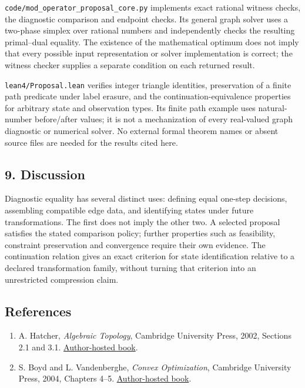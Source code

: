 \documentclass[
]{article}
\providecommand{\tightlist}{%
  \setlength{\itemsep}{0pt}\setlength{\parskip}{0pt}}
\begin{document}
\nolinkurl{code/mod_operator_proposal_core.py} implements exact rational
witness checks, the diagnostic comparison and endpoint checks. Its
general graph solver uses a two-phase simplex over rational numbers and
independently checks the resulting primal--dual equality. The existence
of the mathematical optimum does not imply that every possible input
representation or solver implementation is correct; the witness checker
supplies a separate condition on each returned result.

\nolinkurl{lean4/Proposal.lean} verifies integer triangle identities,
preservation of a finite path predicate under label erasure, and the
continuation-equivalence properties for arbitrary state and observation
types. Its finite path example uses natural-number before/after values;
it is not a mechanization of every real-valued graph diagnostic or
numerical solver. No external formal theorem names or absent source
files are needed for the results cited here.

\subsection{9. Discussion}\label{discussion}

Diagnostic equality has several distinct uses: defining equal one-step
decisions, assembling compatible edge data, and identifying states under
future transformations. The first does not imply the other two. A
selected proposal satisfies the stated comparison policy; further
properties such as feasibility, constraint preservation and convergence
require their own evidence. The continuation relation gives an exact
criterion for state identification relative to a declared transformation
family, without turning that criterion into an unrestricted compression
claim.

\subsection{References}\label{references}

\begin{enumerate}
\def\labelenumi{\arabic{enumi}.}
\tightlist
\item
  A. Hatcher, \emph{Algebraic Topology}, Cambridge University Press,
  2002, Sections 2.1 and 3.1.
  \href{https://pi.math.cornell.edu/~hatcher/AT/ATpage.html}{Author-hosted
  book}.
\item
  S. Boyd and L. Vandenberghe, \emph{Convex Optimization}, Cambridge
  University Press, 2004, Chapters 4--5.
  \href{https://web.stanford.edu/~boyd/cvxbook/}{Author-hosted book}.
\end{enumerate}
\end{document}
